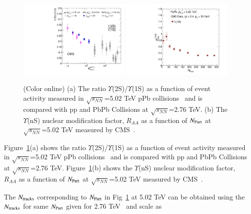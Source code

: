    


\begin{figure}
  \begin{center}
\includegraphics[width=0.49\textwidth]{Figures/ExpOverview/Fig_trk_pPb.pdf}
\includegraphics[width=0.49\textwidth]{Figures/ExpOverview/Fig_CMS_Y1SRAANPart.pdf}
\caption{(Color online)
  (a) The ratio $\Upsilon$(2S)/$\Upsilon$(1S) as a function of event activity measured in 
$\sqrt{s_{NN}}$=5.02 TeV pPb collisions~\cite{CMS:2013jsu} and is compared with pp
and PbPb Collisions at $\sqrt{s_{NN}}$=2.76 TeV.
(b) The $\Upsilon$(nS) nuclear modification factor, $R_{AA}$ as a function of $N_{\rm Part}$
at $\sqrt{s_{NN}}$=5.02 TeV measured by CMS~\cite{CMS:2018zza}.
}
\label{fig:UpsilonpPb}
\end{center}
\end{figure}

Figure~\ref{fig:UpsilonpPb}(a) shows
the ratio $\Upsilon$(2S)/$\Upsilon$(1S) as a function of event activity measured in 
$\sqrt{s_{NN}}$=5.02 TeV pPb collisions~\cite{CMS:2013jsu} and is compared with pp
and PbPb Collisions at $\sqrt{s_{NN}}$=2.76 TeV.
Figure~\ref{fig:UpsilonpPb}(b) shows the $\Upsilon$(nS) nuclear modification factor, $R_{AA}$ as a function of $N_{\rm Part}$
at $\sqrt{s_{NN}}$=5.02 TeV measured by CMS~\cite{CMS:2018zza}.

  

The $N_{\rm tracks}$ corresponding to $N_{\rm Part}$ in Fig~\ref{fig:UpsilonpPb} at 5.02 TeV
can be obtained using the $N_{\rm tracks}$ for same $N_{\rm Part}$ given
for 2.76 TeV~\cite{Khachatryan:2016xxp} and scale as 

